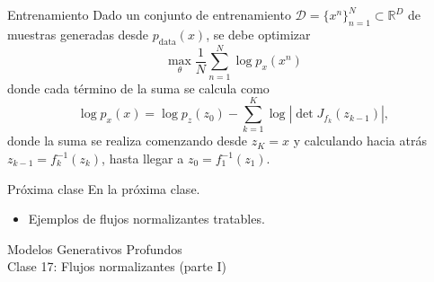 \documentclass{beamer}
\newcommand{\R}{\mathbb{R}}
\begin{document}
\begin{frame}{Entrenamiento}
    Dado un conjunto de entrenamiento $\mathcal{D}=\{x^n\}_{n=1}^N\subset\R^D$ de muestras generadas desde $p_\text{data}(x)$, se debe optimizar
    \begin{equation*}
        \max_\theta \frac{1}{N}\sum_{n=1}^N \log p_x(x^n)
    \end{equation*}
    donde cada término de la suma se calcula como
    \begin{equation*}
        \log p_x(x) = \log p_z(z_0) - \sum
        _{k=1}^K \log\left|\det J_{f_k}(z_{k-1})\right|,
    \end{equation*}
    donde la suma se realiza comenzando desde $z_K=x$ y calculando hacia atrás $z_{k-1}=f_k^{-1}(z_k)$, hasta llegar a $z_0=f_1^{-1}(z_1)$.
\end{frame}

\begin{frame}{Próxima clase}
    En la próxima clase.
    \begin{itemize}
        \item Ejemplos de flujos normalizantes tratables.
    \end{itemize}
\end{frame}

\begin{frame}
    \centering
    \Large{Modelos Generativos Profundos}\\
    \large{Clase 17: Flujos normalizantes (parte I)}
\end{frame}
\end{document}
